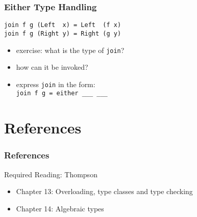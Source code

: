 \documentclass[dvipsnames]{beamer}
\theoremstyle{plain}
\begin{document}
\begin{frame}[fragile]
  \frametitle{Either Type Handling}

  \begin{lstlisting}
join f g (Left  x) = Left  (f x)
join f g (Right y) = Right (g y)
  \end{lstlisting}

  \medskip
  \begin{itemize}
    \item exercise: what is the type of \lstinline|join|?
    \item how can it be invoked?
    \item express \lstinline|join| in the form:\\
      \lstinline|join f g = either ___ ___|
  \end{itemize}
\end{frame}

\section*{References}

\begin{frame}
  \frametitle{References}

  \begin{block}{Required Reading: Thompson}
    \begin{itemize}
      \item Chapter 13: \alert{Overloading, type classes and type checking}
      \item Chapter 14: \alert{Algebraic types}
    \end{itemize}
  \end{block}
\end{frame}
\end{document}
